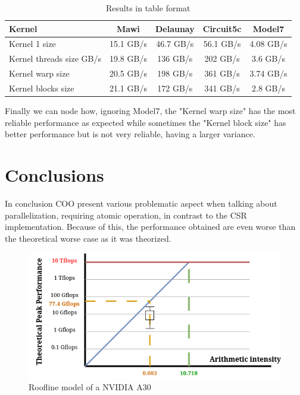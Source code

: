 \documentclass[conference]{IEEEtran}
\begin{document}
\begin{table}[hbt!]
	\centering
	\begin{adjustbox}{width=\columnwidth}
		\begin{tabular}{lcccc}
			\toprule
			\textbf{Kernel} & \textbf{Mawi} & \textbf{Delaunay} & \textbf{Circuit5c} & \textbf{Model7}\\
			\midrule
			Kernel 1 size & 15.1 GB/s & 46.7 GB/s & 56.1 GB/s & 4.08 GB/s\\
			Kernel threads size GB/s & 19.8 GB/s & 136 GB/s & 202 GB/s & 3.6 GB/s\\
			Kernel warp size & 20.5 GB/s & 198 GB/s & 361 GB/s & 3.74 GB/s\\
			Kernel blocks size & 21.1 GB/s & 172 GB/s & 341 GB/s & 2.8 GB/s\\
			\bottomrule
		\end{tabular}
	\end{adjustbox}
	\vspace{1em}

	\caption{Results in table format}
	\label{tab:gpu-results}
\end{table}

\FloatBarrier

Finally we can node how, ignoring Model7, the "Kernel warp size" has the most reliable performance as expected while sometimes the "Kernel block size" has better performance but is not very reliable, having a larger variance.


\section{Conclusions}
In conclusion COO present various problematic aspect when talking about parallelization, requiring atomic operation, in contrast to the CSR implementation. Because of this, the performance obtained are even worse than the theoretical worse case as it was theorized.



\begin{figure}[hbt!]
	\centering
	\includegraphics[width=1\linewidth]{data_images/roofline}
	\caption{Roofline model of a NVIDIA A30}
	\label{fig:roofline}
\end{figure}
\end{document}
